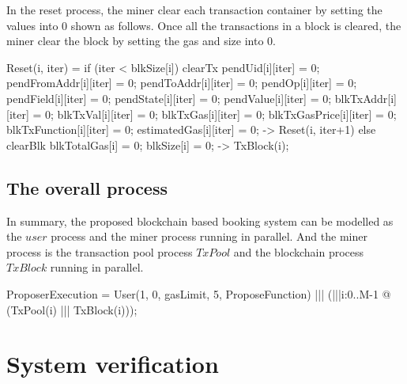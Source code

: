 \documentclass{KERauth}
\begin{document}
In the reset process, the miner clear each transaction container by setting the values into $0$ shown as follows. Once all the transactions in a block is cleared, the miner clear the block by setting the gas and size into $0$.
\begin{center}
\begin{boxedverbatim}
Reset(i, iter) =
  if (iter < blkSize[i]) {clearTx{
                                 pendUid[i][iter] = 0;
                                 pendFromAddr[i][iter] = 0;
                                 pendToAddr[i][iter] = 0;
                                 pendOp[i][iter] = 0;
                                 pendField[i][iter] = 0;
                                 pendState[i][iter] = 0;
                                 pendValue[i][iter] = 0;
                                 blkTxAddr[i][iter] = 0;
                                 blkTxVal[i][iter] = 0;
                                 blkTxGas[i][iter] = 0;
                                 blkTxGasPrice[i][iter] = 0;
                                 blkTxFunction[i][iter] = 0;
                                 estimatedGas[i][iter] = 0;} ->
                         Reset(i, iter+1)}
  else {clearBlk{
                 blkTotalGas[i] = 0;
                 blkSize[i] = 0;} ->
        TxBlock(i)};
\end{boxedverbatim}
\end{center}

\subsection{The overall process}

In summary, the proposed blockchain based booking system can be modelled as the $user$ process and the miner process running in parallel. And the miner process is the transaction pool process $TxPool$ and the blockchain process $TxBlock$ running in parallel.
\begin{center}
\begin{boxedverbatim}
ProposerExecution = User(1, 0, gasLimit, 5, ProposeFunction) |||
                    (|||i:{0..M-1} @ (TxPool(i) ||| TxBlock(i)));
\end{boxedverbatim}
\end{center}

\section{System verification}
\end{document}
